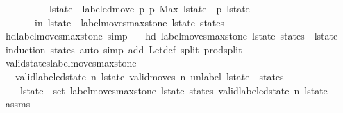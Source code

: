 \begin{isabellebody}
\ \ \ \ \ \ \ \ \ \ l{\isacharunderscore}state{\isacharprime}\ {\isacharequal}\ labeled{\isacharunderscore}move\ p{}\ p{}\ {\isacharparenleft}Max\ {\isacharparenleft}l{\isacharunderscore}state\ {\isacharbang}\ p{}{\isacharparenright}{\isacharparenright}\ l{\isacharunderscore}state\isanewline
\ \ \ \ \ \ \ in\ l{\isacharunderscore}state\ {\isacharhash}\ label{\isacharunderscore}moves{\isacharunderscore}max{\isacharunderscore}stone\ l{\isacharunderscore}state{\isacharprime}\ states{\isacharparenright}{\isachardoublequoteclose}\isanewline
\isanewline
{}\isamarkupfalse%
\ hd{\isacharunderscore}label{\isacharunderscore}moves{\isacharunderscore}max{\isacharunderscore}stone\ {\isacharbrackleft}simp{\isacharbrackright}{\isacharcolon}\isanewline
\ \ \ {\isachardoublequoteopen}hd\ {\isacharparenleft}label{\isacharunderscore}moves{\isacharunderscore}max{\isacharunderscore}stone\ l{\isacharunderscore}state\ states{\isacharparenright}\ {\isacharequal}\ l{\isacharunderscore}state{\isachardoublequoteclose}\isanewline
%
\isadelimproof
\ \ %
\endisadelimproof
%
\isatagproof
{}\isamarkupfalse%
\ {\isacharparenleft}induction\ states{\isacharparenright}\ {\isacharparenleft}auto\ simp\ add{\isacharcolon}\ Let{\isacharunderscore}def\ split{\isacharcolon}\ prod{\isachardot}split{\isacharparenright}%
\endisatagproof
{\isafoldproof}%
%
\isadelimproof
\isanewline
%
\endisadelimproof
\isanewline
{}\isamarkupfalse%
\ valid{\isacharunderscore}states{\isacharunderscore}label{\isacharunderscore}moves{\isacharunderscore}max{\isacharunderscore}stone{\isacharcolon}\isanewline
\ \ \ {\isachardoublequoteopen}valid{\isacharunderscore}labeled{\isacharunderscore}state\ n\ l{\isacharunderscore}state{\isachardoublequoteclose}\ {\isachardoublequoteopen}valid{\isacharunderscore}moves\ n\ {\isacharparenleft}unlabel\ l{\isacharunderscore}state\ {\isacharhash}\ states{\isacharparenright}{\isachardoublequoteclose}\isanewline
\ \ \ {\isachardoublequoteopen}{\isasymforall}\ l{\isacharunderscore}state{\isacharprime}\ {\isasymin}\ set\ {\isacharparenleft}label{\isacharunderscore}moves{\isacharunderscore}max{\isacharunderscore}stone\ l{\isacharunderscore}state\ states{\isacharparenright}{\isachardot}\ valid{\isacharunderscore}labeled{\isacharunderscore}state\ n\ l{\isacharunderscore}state{\isacharprime}{\isachardoublequoteclose}\isanewline
%
\isadelimproof
\ \ %
\endisadelimproof
%
\isatagproof
{}\isamarkupfalse%
\ assms\isanewline
{}\isamarkupfalse%

\end{isabellebody}
